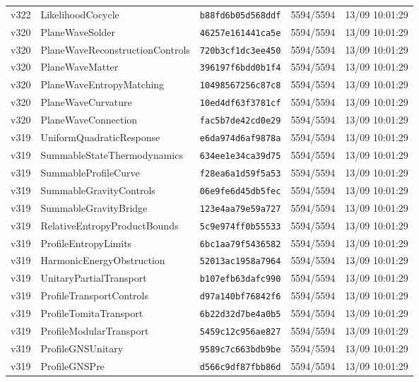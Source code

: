 \documentclass[11pt]{article}
\theoremstyle{definition}\newtheorem{deriv}{Derivação}
\begin{document}
{\begin{longtable}{@{}lllll@{}}
v322 & LikelihoodCocycle & \texttt{b88fd6b05d568ddf} & 5594/5594 & 13/09 10:01:29 \\
v320 & PlaneWaveSolder & \texttt{46257e161441ca5e} & 5594/5594 & 13/09 10:01:29 \\
v320 & PlaneWaveReconstructionControls & \texttt{720b3cf1dc3ee450} & 5594/5594 & 13/09 10:01:29 \\
v320 & PlaneWaveMatter & \texttt{396197f6bdd0b1f4} & 5594/5594 & 13/09 10:01:29 \\
v320 & PlaneWaveEntropyMatching & \texttt{10498567256c87c8} & 5594/5594 & 13/09 10:01:29 \\
v320 & PlaneWaveCurvature & \texttt{10ed4df63f3781cf} & 5594/5594 & 13/09 10:01:29 \\
v320 & PlaneWaveConnection & \texttt{fac5b7de42cd0e29} & 5594/5594 & 13/09 10:01:29 \\
v319 & UniformQuadraticResponse & \texttt{e6da974d6af9878a} & 5594/5594 & 13/09 10:01:29 \\
v319 & SummableStateThermodynamics & \texttt{634ee1e34ca39d75} & 5594/5594 & 13/09 10:01:29 \\
v319 & SummableProfileCurve & \texttt{f28ea6a1d59f5a53} & 5594/5594 & 13/09 10:01:29 \\
v319 & SummableGravityControls & \texttt{06e9fe6d45db5fec} & 5594/5594 & 13/09 10:01:29 \\
v319 & SummableGravityBridge & \texttt{123e4aa79e59a727} & 5594/5594 & 13/09 10:01:29 \\
v319 & RelativeEntropyProductBounds & \texttt{5c9e974ff0b55533} & 5594/5594 & 13/09 10:01:29 \\
v319 & ProfileEntropyLimits & \texttt{6bc1aa79f5436582} & 5594/5594 & 13/09 10:01:29 \\
v319 & HarmonicEnergyObstruction & \texttt{52013ac1958a7964} & 5594/5594 & 13/09 10:01:29 \\
v319 & UnitaryPartialTransport & \texttt{b107efb63dafc990} & 5594/5594 & 13/09 10:01:29 \\
v319 & ProfileTransportControls & \texttt{d97a140bf76842f6} & 5594/5594 & 13/09 10:01:29 \\
v319 & ProfileTomitaTransport & \texttt{6b22d32d7be4a0b5} & 5594/5594 & 13/09 10:01:29 \\
v319 & ProfileModularTransport & \texttt{5459c12c956ae827} & 5594/5594 & 13/09 10:01:29 \\
v319 & ProfileGNSUnitary & \texttt{9589c7c663bdb9be} & 5594/5594 & 13/09 10:01:29 \\
v319 & ProfileGNSPre & \texttt{d566c9df87fbb86d} & 5594/5594 & 13/09 10:01:29 \\

\end{longtable}}
\end{document}
